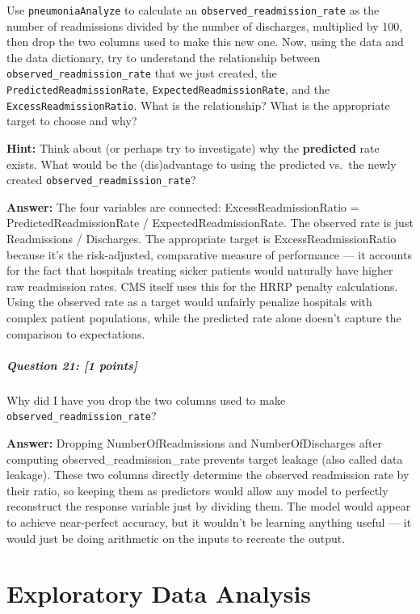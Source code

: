 \documentclass[
]{article}
\begin{document}
Use \texttt{pneumoniaAnalyze} to calculate an
\texttt{observed\_readmission\_rate} as the number of readmissions
divided by the number of discharges, multiplied by 100, then drop the
two columns used to make this new one. Now, using the data and the data
dictionary, try to understand the relationship between
\texttt{observed\_readmission\_rate} that we just created, the
\texttt{PredictedReadmissionRate}, \texttt{ExpectedReadmissionRate}, and
the \texttt{ExcessReadmissionRatio}. What is the relationship? What is
the appropriate target to choose and why?

\textbf{Hint: }Think about (or perhaps try to investigate) why the
\textbf{predicted} rate exists. What would be the (dis)advantage to
using the predicted vs.~the newly created
\texttt{observed\_readmission\_rate}?

\textbf{Answer:} The four variables are connected:
ExcessReadmissionRatio = PredictedReadmissionRate /
ExpectedReadmissionRate. The observed rate is just Readmissions /
Discharges. The appropriate target is ExcessReadmissionRatio because
it's the risk-adjusted, comparative measure of performance --- it
accounts for the fact that hospitals treating sicker patients would
naturally have higher raw readmission rates. CMS itself uses this for
the HRRP penalty calculations. Using the observed rate as a target would
unfairly penalize hospitals with complex patient populations, while the
predicted rate alone doesn't capture the comparison to expectations.

\subparagraph{\texorpdfstring{\textbf{Question 21}: {[}1
points{]}}{Question 21: {[}1 points{]}}}\label{question-21-1-points}

Why did I have you drop the two columns used to make
\texttt{observed\_readmission\_rate}?

\textbf{Answer:} Dropping NumberOfReadmissions and NumberOfDischarges
after computing observed\_readmission\_rate prevents target leakage
(also called data leakage). These two columns directly determine the
observed readmission rate by their ratio, so keeping them as predictors
would allow any model to perfectly reconstruct the response variable
just by dividing them. The model would appear to achieve near-perfect
accuracy, but it wouldn't be learning anything useful --- it would just
be doing arithmetic on the inputs to recreate the output.

\section{Exploratory Data Analysis}\label{exploratory-data-analysis}
\end{document}
